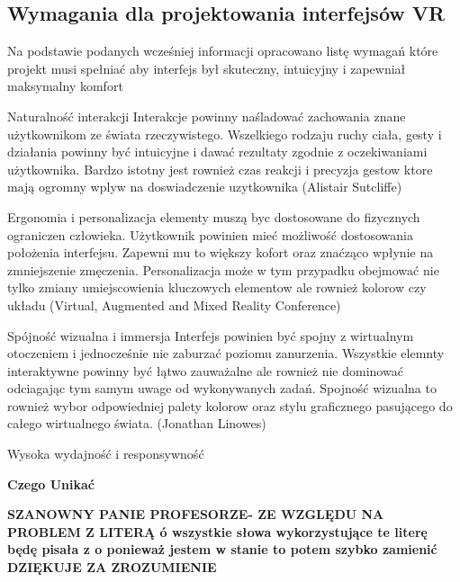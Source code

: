 \subsection{Wymagania dla projektowania interfejsów VR}

Na podstawie podanych wcześniej informacji opracowano listę wymagań które projekt musi spełniać aby interfejs był skuteczny, intuicyjny i zapewniał maksymalny komfort


Naturalność interakcji
Interakcje powinny naśladować  zachowania znane użytkownikom ze świata rzeczywistego. Wszelkiego rodzaju ruchy ciała, gesty i działania powinny być intuicyjne i dawać rezultaty zgodnie z oczekiwaniami użytkownika. Bardzo istotny jest rownież czas reakcji i precyzja gestow ktore mają ogromny wplyw na doswiadczenie uzytkownika (Alistair Sutcliffe)

Ergonomia i personalizacja
elementy muszą byc dostosowane do fizycznych ograniczen człowieka. Użytkownik powinien mieć możliwość dostosowania położenia interfejsu. Zapewni mu to większy kofort oraz znaćząco wpłynie na zmniejszenie zmęczenia. Personalizacja może w tym przypadku obejmować nie tylko zmiany umiejscowienia kluczowych elementow ale rownież kolorow czy układu (Virtual, Augmented and Mixed Reality Conference)

Spójność wizualna i immersja
Interfejs powinien być spojny z wirtualnym otoczeniem i jednocześnie nie zaburzać poziomu zanurzenia. Wszystkie elemnty interaktywne powinny być łątwo zauważalne ale rownież nie dominować odciagając tym samym uwage od wykonywanych zadań.
Spojność wizualna to rownież wybor odpowiedniej palety kolorow oraz stylu graficznego pasującego do całego wirtualnego świata.
(Jonathan Linowes)

Wysoka wydajność i responsywność





\textbf{Czego Unikać}



\textbf{
SZANOWNY PANIE PROFESORZE- ZE WZGLĘDU NA PROBLEM Z LITERĄ ó wszystkie słowa wykorzystujące te literę będę pisała z o ponieważ jestem w stanie to potem szybko zamienić 
DZIĘKUJE ZA ZROZUMIENIE}